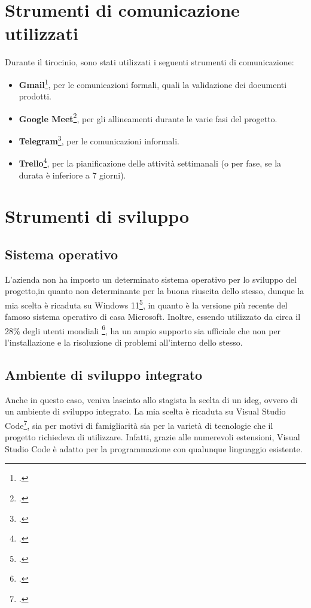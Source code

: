 \section{Strumenti di comunicazione utilizzati}

Durante il tirocinio, sono stati utilizzati i seguenti strumenti di comunicazione:
\begin{itemize}
    \item \textbf{Gmail}\footcite{site:gmail}, per le comunicazioni formali, quali la validazione dei documenti prodotti.
    \item \textbf{Google Meet}\footcite{site:meet}, per gli allineamenti durante le varie fasi del progetto.
    \item \textbf{Telegram}\footcite{site:telegram}, per le comunicazioni informali.
    \item \textbf{Trello}\footcite{site:trello}, per la pianificazione delle attività settimanali (o per fase, se la durata è inferiore a 7 giorni).
\end{itemize}

\section{Strumenti di sviluppo}
\label{sec:sviluppoStrum}
\subsection{Sistema operativo}
L'azienda non ha imposto un determinato sistema operativo per lo sviluppo del progetto,in quanto non determinante per la buona riuscita dello stesso, dunque la mia scelta è ricaduta su Windows 11\footcite{site:w11}, in quanto è la versione più recente del famoso sistema operativo di casa Microsoft. Inoltre, essendo utilizzato da circa il 28\% degli utenti mondiali \footcite{site:statOS}, ha un ampio supporto sia ufficiale che non per l'installazione e la risoluzione di problemi all'interno dello stesso.
\subsection{Ambiente di sviluppo integrato}
Anche in questo caso, veniva lasciato allo stagista la scelta di un \gls{ideg}, ovvero di un ambiente di sviluppo integrato. La mia scelta è ricaduta su Visual Studio Code\footcite{site:vscode}, sia per motivi di famigliarità sia per la varietà di tecnologie che il progetto richiedeva di utilizzare. Infatti, grazie alle numerevoli estensioni, Visual Studio Code è adatto per la programmazione con qualunque linguaggio esistente.
